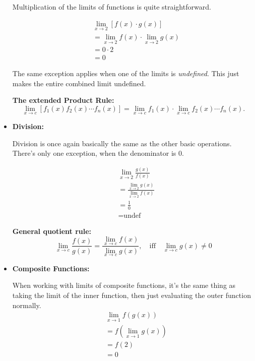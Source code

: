 \documentclass[12pt]{article}
\begin{document}
\begin{itemize}
          Multiplication of the limits of functions is quite straightforward.

          \begin{align*}
               & \lim_{x \to 2} \left[ f(x) \cdot g(x) \right]   \\
               & = \lim_{x \to 2} f(x) \cdot \lim_{x \to 2} g(x) \\
               & = 0 \cdot 2                                     \\
               & = 0
          \end{align*}

          \indent The same exception applies when one of the limits is \textit{undefined}. This just makes the entire combined limit undefined.

          \noindent\textbf{The extended Product Rule:}
          \begin{equation*}
              \lim_{x \to c} \left[ f_1(x) f_2(x) \cdots f_n(x) \right]
              = \lim_{x \to c} f_1(x) \cdot \lim_{x \to c} f_2(x)
              \cdots f_n(x).
          \end{equation*}
          \smallskip

    \item \textbf{Division:}

          Division is once again basically the same as the other basic operations. There's only one exception, when the denominator is $0$.

          \begin{align*}
               & \lim_{x \to 2} \frac{g(x)}{f(x)}                  \\
               & = \frac{\lim_{x \to 2} g(x)}{\lim_{x \to 2} f(x)} \\
               & = \frac{1}{0}                                     \\
               & = \text{undef}
          \end{align*}

          \noindent\textbf{General quotient rule:}
          \[ \lim_{x \to c} \frac{f(x)}{g(x)} = \frac{\lim_{x \to c} f(x)}{\lim_{x \to c} g(x)}, \quad \textrm{iff} \quad \lim_{x \to c} g(x) \ne 0 \]
          \smallskip

    \item \textbf{Composite Functions:}

          When working with limits of composite functions, it's the same thing as taking the limit of the inner function, then just evaluating the outer function normally.
          \begin{align*}
               & \lim_{x \to 1} f\left(g(x)\right)     \\
               & = f\left( \lim_{x \to 1} g(x) \right) \\
               & = f(2)                                \\
               & = 0
          \end{align*}


\end{itemize}
\end{document}
